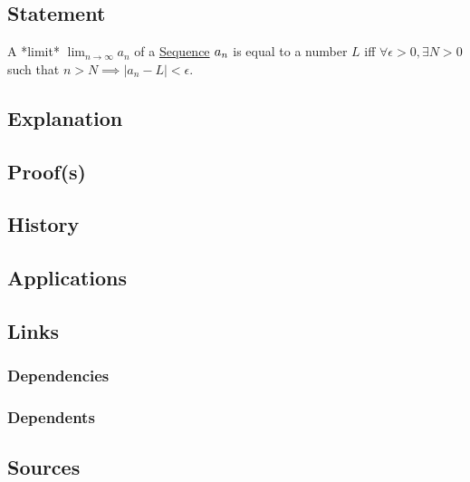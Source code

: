 \subsection{Statement}
A *limit* $\lim_{n\to\infty} a_n$ of a \hyperref[articles:analysis:sequence]{Sequence} $\\{a_n\\}$ is equal to a number $L$ iff $\forall \epsilon > 0, \exists N > 0$ such that $n > N \implies \lvert a_n - L \rvert < \epsilon$.

\subsection{Explanation}

\subsection{Proof(s)}

\subsection{History}

\subsection{Applications}

\subsection{Links}
\subsubsection{Dependencies}
\subsubsection{Dependents}

\subsection{Sources}

